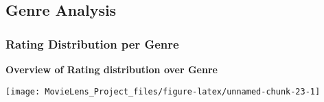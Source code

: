\documentclass[]{article}
\newenvironment{Shaded}{}{}
\newcommand{\DataTypeTok}[1]{\textcolor[rgb]{0.56,0.13,0.00}{#1}}
\newcommand{\DecValTok}[1]{\textcolor[rgb]{0.25,0.63,0.44}{#1}}
\newcommand{\KeywordTok}[1]{\textcolor[rgb]{0.00,0.44,0.13}{\textbf{#1}}}
\newcommand{\NormalTok}[1]{#1}
\newcommand{\OperatorTok}[1]{\textcolor[rgb]{0.40,0.40,0.40}{#1}}
\newcommand{\OtherTok}[1]{\textcolor[rgb]{0.00,0.44,0.13}{#1}}
\newcommand{\StringTok}[1]{\textcolor[rgb]{0.25,0.44,0.63}{#1}}
\begin{document}
\hypertarget{genre-analysis}{%
\subsection{Genre Analysis}\label{genre-analysis}}

\hypertarget{rating-distribution-per-genre}{%
\subsubsection{Rating Distribution per
Genre}\label{rating-distribution-per-genre}}

\textbf{Overview of Rating distribution over Genre}

\begin{center}\texttt{[image: MovieLens\_Project\_files/figure-latex/unnamed-chunk-23-1]} \end{center}

\begin{Shaded}
\end{Shaded}
\end{document}
